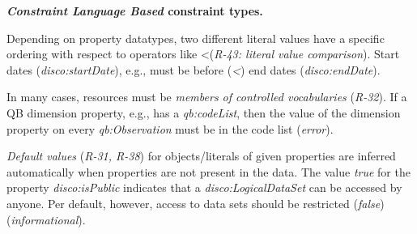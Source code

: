 \documentclass[conference]{IEEEtran}
\begin{document}

\textbf{\emph{Constraint Language Based} constraint types.}

Depending on property datatypes, two different literal values have
a specific ordering with respect to operators like \textless  (\emph{R-43: literal value comparison}).
Start dates (\emph{disco:startDate}), e.g., must be before (\emph{\textless}) end dates (\emph{disco:endDate}).


In many cases, resources must be \emph{members of controlled vocabularies} (\emph{R-32}).
If a QB dimension property, e.g., has a \emph{qb:codeList},
then the value of the dimension property on every \emph{qb:Observation} must be in the code list (\emph{error}).

\emph{Default values} (\emph{R-31, R-38}) for objects/literals of given properties are inferred automatically when properties are not present in the data.
The value \emph{true} for the property {\em disco:isPublic} indicates that a {\em disco:LogicalDataSet} can be accessed by anyone.
Per default, however, access to data sets should be restricted (\emph{false}) (\emph{informational}).
\end{document}
